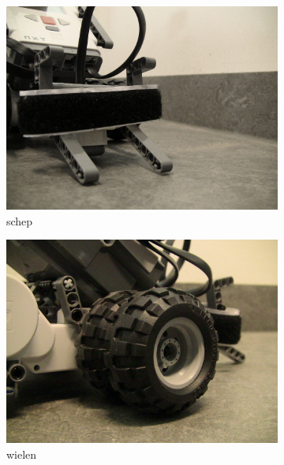 \documentclass[tt2]{penoverslag}
\begin{document}
\begin{figure}
\centering
	\begin{subfigure}[h]{0.325\textwidth}
	\centering
		\includegraphics[width=\textwidth]{robotSchep}
		\caption{schep}
	\end{subfigure}
	\begin{subfigure}[h]{0.325\textwidth}
		\centering
		\includegraphics[width=\textwidth]{robotWielen}
		\caption{wielen}
	\end{subfigure}
	\begin{subfigure}[h]{0.325\textwidth}
		\centering

\end{subfigure}
\end{figure}
\end{document}
